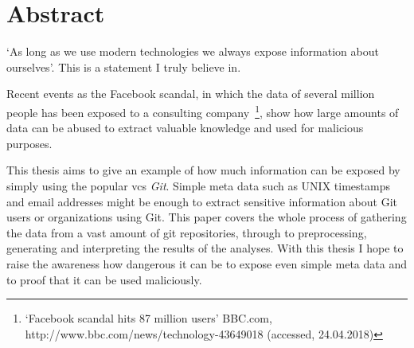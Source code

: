 \chapter*{Abstract}


`As long as we use modern technologies we always expose information about ourselves'. This is a statement I truly believe in.

Recent events as the Facebook scandal, in which the data of several million people has been exposed to a consulting company~\footnote{`Facebook scandal hits 87 million users' BBC.com, http://www.bbc.com/news/technology-43649018 (accessed, 24.04.2018)}, show how large amounts of data can be abused to extract valuable knowledge and used for malicious purposes.

This thesis aims to give an example of how much information can be exposed by simply using the popular \ac{vcs} \emph{Git}.
Simple meta data such as UNIX timestamps and email addresses might be enough to extract sensitive information about Git users or organizations using Git.
This paper covers the whole process of gathering the data from a vast amount of git repositories, through to preprocessing, generating and interpreting the results of the analyses.
With this thesis I hope to raise the awareness how dangerous it can be to expose even simple meta data and to proof that it can be used maliciously.
